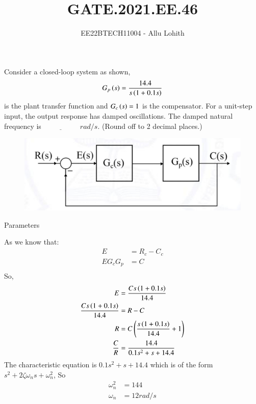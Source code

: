 \documentclass[journal,12pt,twocolumn]{IEEEtran}
\theoremstyle{remark}
\begin{document}

\vspace{3cm}

\title{GATE.2021.EE.46}
\author{EE22BTECH11004 - Allu Lohith}

\maketitle
\newpage
\bigskip

\renewcommand{\thefigure}{\theenumi}
\renewcommand{\thetable}{\theenumi}

Consider a closed-loop system as shown, $$G_p\left(s\right)= \frac{14.4}{s\left(1+0.1s\right)}$$ is the plant transfer function and $G_c\left(s\right)=1$ is the compensator. For a unit-step input, the output response has damped oscillations. The damped natural frequency is $\underline{\hspace{2cm}}$
$rad/s$. (Round off to 2 decimal places.)

\begin{figure}[h]
    \centering  
\includegraphics[width=\columnwidth]{figs/dia.png}
    \label{fig:}
\end{figure}
\solution 
\begin{table}[h!]
\centering

\vspace{0.5cm}
\caption{\normalsize Parameters}
\end{table}
As we know that:
\begin{align}
E&=R_c-C_c\\
EG_cG_p&=C\\
\end{align}
So,
\begin{align}
E &= \frac{Cs\left(1+0.1s\right)}{14.4}\\
\frac{Cs\left(1+0.1s\right)}{14.4} &=R-C\\
R &=C\left(\frac{s\left(1+0.1s\right)}{14.4}+1\right)\\
\frac{C}{R} &= \frac{14.4}{0.1s^2+s+14.4}
\end{align}
The characteristic equation is $0.1s^2+s+14.4$ which is of the form $s^2 + 2\zeta\omega_n s + \omega_n^2$, So 
\begin{align}
    \omega_n^2&=144\\
    \omega_n&= 12rad/s
\end{align}
\end{document}
